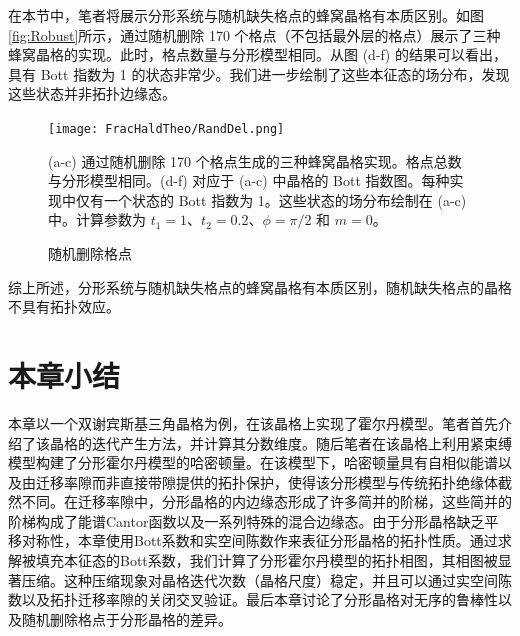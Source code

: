 在本节中，笔者将展示分形系统与随机缺失格点的蜂窝晶格有本质区别。如图\ref{fig:Robust}所示，通过随机删除 170 个格点（不包括最外层的格点）展示了三种蜂窝晶格的实现。此时，格点数量与分形模型相同。从图 (d-f) 的结果可以看出，具有 Bott 指数为 1 的状态非常少。我们进一步绘制了这些本征态的场分布，发现这些状态并非拓扑边缘态。

\begin{figure}[htbp]
    \centering
    \texttt{[image: FracHaldTheo/RandDel.png]}
    \caption{随机删除格点}(a-c) 通过随机删除 170 个格点生成的三种蜂窝晶格实现。格点总数与分形模型相同。(d-f) 对应于 (a-c) 中晶格的 Bott 指数图。每种实现中仅有一个状态的 Bott 指数为 1。这些状态的场分布绘制在 (a-c) 中。计算参数为 $t_1 = 1$、$t_2 = 0.2$、$\phi = \pi/2$ 和 $m = 0$。
    \label{fig:RandDel}
\end{figure}

综上所述，分形系统与随机缺失格点的蜂窝晶格有本质区别，随机缺失格点的晶格不具有拓扑效应。

\section{本章小结}
本章以一个双谢宾斯基三角晶格为例，在该晶格上实现了霍尔丹模型。笔者首先介绍了该晶格的迭代产生方法，并计算其分数维度。随后笔者在该晶格上利用紧束缚模型构建了分形霍尔丹模型的哈密顿量。在该模型下，哈密顿量具有自相似能谱以及由迁移率隙而非直接带隙提供的拓扑保护，使得该分形模型与传统拓扑绝缘体截然不同。在迁移率隙中，分形晶格的内边缘态形成了许多简并的阶梯，这些简并的阶梯构成了能谱Cantor函数以及一系列特殊的混合边缘态。由于分形晶格缺乏平移对称性，本章使用Bott系数和实空间陈数作来表征分形晶格的拓扑性质。通过求解被填充本征态的Bott系数，我们计算了分形霍尔丹模型的拓扑相图，其相图被显著压缩。这种压缩现象对晶格迭代次数（晶格尺度）稳定，并且可以通过实空间陈数以及拓扑迁移率隙的关闭交叉验证。最后本章讨论了分形晶格对无序的鲁棒性以及随机删除格点于分形晶格的差异。